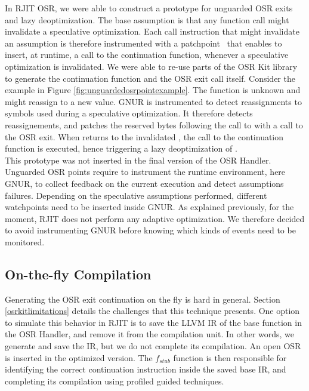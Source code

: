 In RJIT OSR, we were able to construct a prototype for unguarded OSR exits and lazy deoptimization.
The base assumption is that any function call might invalidate a speculative optimization.
Each call instruction that might invalidate an assumption is therefore instrumented with a patchpoint~\cite{llvmPatchpoints} that enables to insert, at runtime, a call to the continuation function, whenever a speculative optimization is invalidated.
We were able to re-use parts of the OSR Kit library to generate the continuation function and the OSR exit call itself.
Consider the example in Figure \ref{fig:unguardedosrpointexample}.
The function  is unknown and might reassign  to a new value.
GNUR is instrumented to detect reassignments to symbols used during a speculative optimization.
It therefore detects  reassignements, and patches the reserved bytes following the call to  with a call to the OSR exit.
When  returns to the invalidated , the call to the continuation function is executed, hence triggering a lazy deoptimization of .\\

This prototype was not inserted in the final version of the OSR Handler.
Unguarded OSR points require to instrument the runtime environment, here GNUR, to collect feedback on the current execution and detect assumptions failures.
Depending on the speculative assumptions performed, different watchpoints need to be inserted inside GNUR.
As explained previously, for the moment, RJIT does not perform any adaptive optimization. 
We therefore decided to avoid instrumenting GNUR before knowing which kinds of events need to be monitored.\\

\subsection{On-the-fly Compilation}

Generating the OSR exit continuation on the fly is hard in general. 
Section \ref{osrkitlimitations} details the challenges that this technique presents.
One option to simulate this behavior in RJIT is to save the LLVM IR of the base function in the OSR Handler, and remove it from the compilation unit.
In other words, we generate and save the IR, but we do not complete its compilation.
An open OSR is inserted in the optimized version. 
The $f_{stub}$ function is then responsible for identifying the correct continuation instruction inside the saved base IR, and completing its compilation using profiled guided techniques.\\

